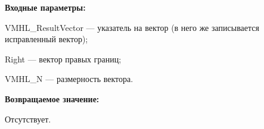\textbf{Входные параметры:}  
 
VMHL\_ResultVector --- указатель на вектор (в него же записывается исправленный вектор);
 
Right --- вектор правых границ;
 
VMHL\_N --- размерность вектора.

\textbf{Возвращаемое значение:}

Отсутствует.